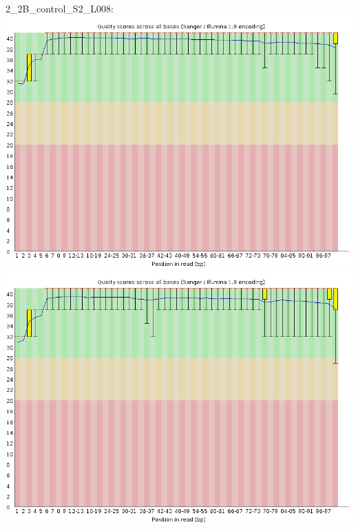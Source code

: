 \documentclass[
]{article}
\begin{document}
2\_2B\_control\_S2\_L008:
\includegraphics{fastqc_plots/2_2B_control_S2_L008_R1_001_perbasequality.png}
\includegraphics{fastqc_plots/2_2B_control_S2_L008_R2_001_perbasequality.png}
\end{document}
